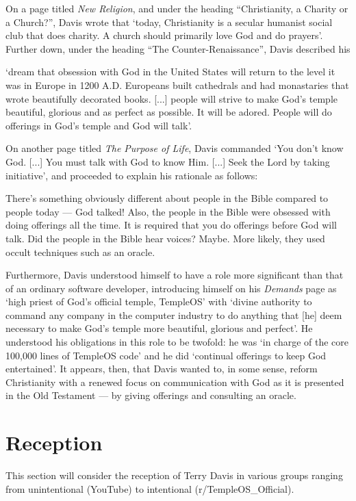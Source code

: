 \documentclass[Draft.tex]{subfiles}
\begin{document}
On a page titled \textit{New Religion}, and under the heading
``Christianity, a Charity or a Church?'', Davis \parencite*{NewReligion}
wrote that `today, Christianity is a secular humanist social club
that does charity.  A church should primarily love God and do prayers'.
Further down, under the heading ``The Counter-Renaissance'',
Davis described his
\begin{displayquote}
	`dream that obsession with God in the United States
	will return to the level it was in Europe in 1200 A.D.
	Europeans built cathedrals and had monastaries
	that wrote beautifully decorated books. [...]
	people will strive to make God's temple beautiful, glorious
	and as perfect as possible.  It will be adored.
	People will do offerings in God's temple and God will talk'.
\end{displayquote}
On another page titled \textit{The Purpose of Life},
Davis \parencite*{PurposeLife} commanded `You don't know God. [...]
You must talk with God to know Him. [...] Seek the Lord by taking initiative',
and proceeded to explain his rationale as follows:
\begin{displayquote}
	There's something obviously different about people in the Bible
	compared to people today --- God talked!
	Also, the people in the Bible were obsessed with doing offerings all the time.
	It is required that you do offerings before God will talk.
	Did the people in the Bible hear voices?  Maybe.
	More likely, they used occult techniques such as an oracle.
\end{displayquote}
Furthermore, Davis \parencite*{Demands} understood himself to have a role
more significant than that of an ordinary software developer,
introducing himself on his \textit{Demands} page as
`high priest of God's official temple, TempleOS' with
`divine authority to command any company in the computer industry
to do anything that [he] deem necessary to make God's temple
more beautiful, glorious and perfect'.
He understood his obligations in this role to be twofold: he was
`in charge of the core 100,000 lines of TempleOS code'
and he did `continual offerings to keep God entertained'.
It appears, then, that Davis wanted to, in some sense, reform Christianity
with a renewed focus on communication with God
as it is presented in the Old Testament ---
by giving offerings and consulting an oracle.


\section*{Reception}
This section will consider the reception of Terry Davis in various groups
ranging from unintentional (YouTube) to intentional (r/TempleOS\_Official).
\end{document}
